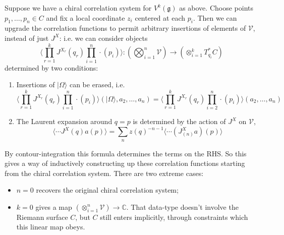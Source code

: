 \documentclass[12pt,letterpaper,reqno]{amsart}
\numberwithin{equation}{section}
\newcommand{\fg}{{\mathfrak g}}
\newcommand{\bbC}{\ensuremath{\mathbb C}}
\newcommand\vac{{|\Omega\rangle}}
\newcommand{\vertex}{\mathcal{V}}
\newcommand{\IP}[1]{\langle#1\rangle}
\begin{document}
Suppose we have a chiral correlation system for $V^k(\fg)$
as above.
Choose points $p_1, \dots, p_n \in C$ and 
fix a local coordinate $z_i$ centered
at each $p_i$.
Then we can upgrade the correlation functions to permit
arbitrary insertions of elements of $\vertex$, instead of just
$J^X$: i.e. we can consider objects
\begin{equation}
  \IP{ \prod_{r=1}^k J^{X_r}(q_r) \prod_{i=1}^n \cdot(p_i) } :  \left(  \bigotimes_{i=1}^n  \vertex \right) \to \left(  \otimes_{i=1}^k T^*_{q_i} C \right)
\end{equation}
determined by two conditions:
\begin{enumerate}
  \item Insertions of $\vac$ can be erased, i.e.
\begin{equation}
  \IP{ \prod_{r=1}^k J^{X_r}(q_r) \prod_{i=1}^n \cdot(p_i) } (\vac, a_2, \dots, a_n) = \IP{ \prod_{r=1}^k J^{X_r}(q_r) \prod_{i=2}^n \cdot(p_i) } (a_2, \dots, a_n)
\end{equation}

  \item 
  The Laurent expansion around $q = p$ is determined by the action
  of $J^X$ on $\vertex$, 
  \begin{equation}
    \IP{ \cdots J^X(q) a(p) } = \sum_n z(q)^{-n-1} \IP{\cdots (J^X_{(n)} a)(p) }
  \end{equation}
\end{enumerate}

  By contour-integration this formula determines the terms on the RHS. So this gives a way of inductively constructing up these
  correlation functions starting from the chiral correlation system.
  There are two extreme cases:
  \begin{itemize}
   \item $n=0$ recovers the original chiral correlation system;
  \item  $k=0$ gives a map $\left( \otimes_{i=1}^n \vertex  \right) \to \bbC$. That data-type doesn't involve the Riemann surface $C$, but $C$ still enters implicitly, through constraints which this linear map obeys.
\end{itemize}
\end{document}
